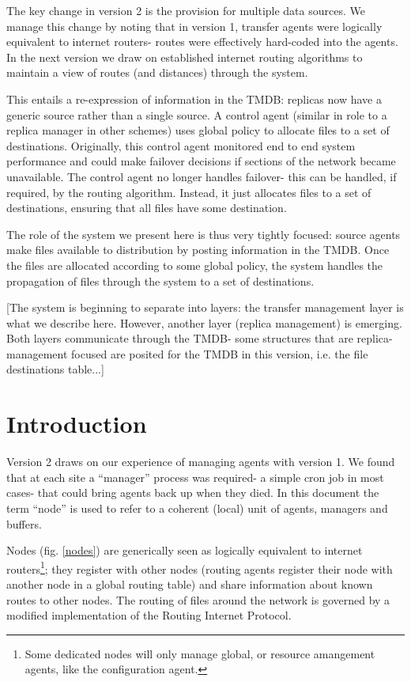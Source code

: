 \documentclass{cmspaper}
\begin{document}
The key change in version 2 is the provision for multiple data sources. We manage this change by noting that in version 1, transfer agents were logically equivalent to internet routers- routes were effectively hard-coded into the agents.  In the next version we draw on established internet routing algorithms to maintain a view of routes (and distances) through the system.

This entails a re-expression of information in the TMDB: replicas now have a generic source rather than a single source. A control agent (similar in role to a replica manager in other schemes) uses global policy to allocate files to a set of destinations.  Originally, this control agent monitored end to end system performance and could make failover decisions if sections of the network became unavailable. The control agent no longer handles failover- this can be handled, if required, by the routing algorithm. Instead, it just allocates files to a set of destinations, ensuring that all files have some destination.

The role of the system we present here is thus very tightly focused: source agents make files available to distribution by posting information in the TMDB. Once the files are allocated according to some global policy, the system handles the propagation of files through the system to a set of destinations.

[The system is beginning to separate into layers: the transfer management layer is what we describe here. However, another layer (replica management) is emerging. Both layers communicate through the TMDB- some structures that are replica-management focused are posited for the TMDB in this version, i.e. the file destinations table...] 

\section{Introduction}
Version 2 draws on our experience of managing agents with version 1. We found that at each site a ``manager'' process was required- a simple cron job in most cases- that could bring agents back up when they died.  In this document the term ``node'' is used to refer to a coherent (local) unit of agents, managers and buffers.

Nodes (fig. \ref{nodes}) are generically seen as logically equivalent to internet routers\footnote{Some dedicated nodes will only manage global, or resource amangement agents, like the configuration agent.}; they register with other nodes (routing agents register their node with another node in a global routing table) and share information about known routes to other nodes.  The routing of files around the network is governed by a modified implementation of the Routing Internet Protocol.
\end{document}
